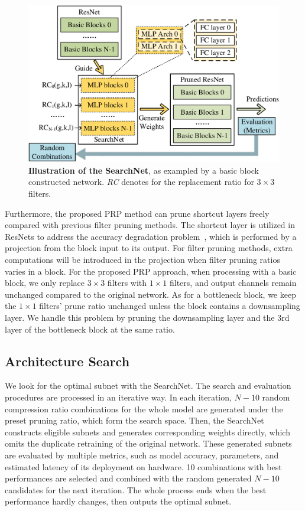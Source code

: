\documentclass[journal,article,submit,pdftex,moreauthors]{Definitions/mdpi}
\begin{document}
\begin{figure} [t]
	\centering
	\includegraphics[width=13cm]{figs/SearchNet-arch.pdf}
	\caption{\textbf{Illustration of the SearchNet}, as exampled by a basic block constructed network. \textit{RC} denotes for the replacement ratio for $3\times 3$ filters.}
	\label{fig: Searchnet}
\end{figure}

Furthermore, the proposed PRP method can prune shortcut layers freely compared with previous filter pruning methods. The shortcut layer is utilized in ResNets to address the accuracy degradation problem~\cite{M19}, which is performed by a projection from the block input to its output. For filter pruning methods, extra computations will be introduced in the projection when filter pruning ratios varies in a block. For the proposed PRP approach, when processing with a basic block, we only replace $3\times 3$ filters with $1\times 1$ filters, and output channels remain unchanged compared to the original network. As for a bottleneck block, we keep the $1\times 1$ filters' prune ratio unchanged unless the block contains a downsampling layer. We handle this problem by pruning the downsampling layer and the 3rd layer of the bottleneck block at the same ratio.

\subsection{Architecture Search}
We look for the optimal subnet with the SearchNet. The search and evaluation procedures are processed in an iterative way. In each iteration, $N-10$ random compression ratio combinations for the whole model are generated under the preset pruning ratio, which form the search space. Then, the SearchNet constructs eligible subnets and generates corresponding weights directly, which omits the duplicate retraining of the original network. These generated subnets are evaluated by multiple metrics, such as model accuracy, parameters, and estimated latency of its deployment on hardware. 10 combinations with best performances are selected and combined with the random generated $N-10$ candidates for the next iteration. The whole process ends when the best performance hardly changes, then outputs the optimal subnet.
\end{document}
